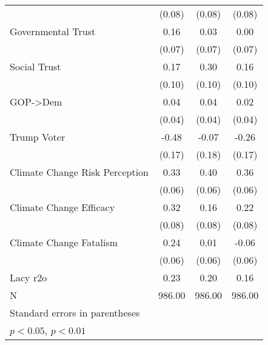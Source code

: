 \begin{table}[htbp]
\begin{tabular}{l*{3}{c}}
                    &      (0.08)        &      (0.08)        &      (0.08)        \\
[1em]
Governmental Trust  &        0.16\sym{*} &        0.03        &        0.00        \\
                    &      (0.07)        &      (0.07)        &      (0.07)        \\
[1em]
Social Trust        &        0.17        &        0.30\sym{**}&        0.16        \\
                    &      (0.10)        &      (0.10)        &      (0.10)        \\
[1em]
GOP->Dem            &        0.04        &        0.04        &        0.02        \\
                    &      (0.04)        &      (0.04)        &      (0.04)        \\
[1em]
Trump Voter         &       -0.48\sym{**}&       -0.07        &       -0.26        \\
                    &      (0.17)        &      (0.18)        &      (0.17)        \\
[1em]
Climate Change Risk Perception&        0.33\sym{**}&        0.40\sym{**}&        0.36\sym{**}\\
                    &      (0.06)        &      (0.06)        &      (0.06)        \\
[1em]
Climate Change Efficacy&        0.32\sym{**}&        0.16        &        0.22\sym{**}\\
                    &      (0.08)        &      (0.08)        &      (0.08)        \\
[1em]
Climate Change Fatalism&        0.24\sym{**}&        0.01        &       -0.06        \\
                    &      (0.06)        &      (0.06)        &      (0.06)        \\
\hline
Lacy r2o            &        0.23        &        0.20        &        0.16        \\
N                   &      986.00        &      986.00        &      986.00        \\
\hline\hline
\multicolumn{4}{l}{\footnotesize Standard errors in parentheses}\\
\multicolumn{4}{l}{\footnotesize \sym{*} \(p<0.05\), \sym{**} \(p<0.01\)}\\
\end{tabular}
\end{table}
